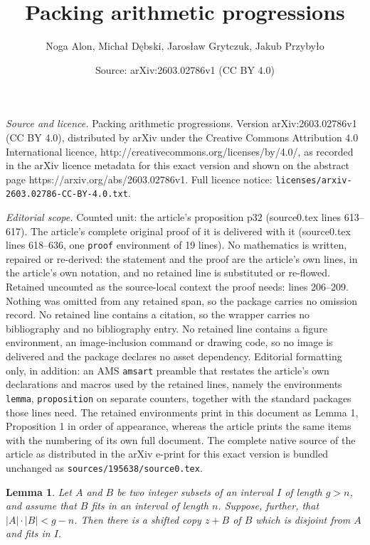 \documentclass[10pt,a4paper]{amsart}
\title{Packing arithmetic progressions}
\author{Noga Alon, Micha{\l} D\k ebski, Jaros\l aw Grytczuk, Jakub Przyby\l o}
\date{Source: arXiv:2603.02786v1 (CC BY 4.0)}
\newtheorem{lemma}{Lemma}
\begin{document}
\maketitle

\noindent\emph{Source and licence.} Packing arithmetic progressions. Version arXiv:2603.02786v1 (CC BY 4.0), distributed by arXiv under the Creative Commons Attribution 4.0 International licence, http://creativecommons.org/licenses/by/4.0/, as recorded in the arXiv licence metadata for this exact version and shown on the abstract page https://arxiv.org/abs/2603.02786v1. Full licence notice: \texttt{licenses/arxiv-2603.02786-CC-BY-4.0.txt}.\par\smallskip

\noindent\textit{Editorial scope.} Counted unit: the article's proposition p32 (source0.tex lines 613--617). The article's complete original proof of it is delivered with it (source0.tex lines 618--636, one \texttt{proof} environment of 19 lines). No mathematics is written, repaired or re-derived: the statement and the proof are the article's own lines, in the article's own notation, and no retained line is substituted or re-flowed.  Retained uncounted as the source-local context the proof needs: lines 206--209.  Nothing was omitted from any retained span, so the package carries no omission record.  No retained line contains a citation, so the wrapper carries no bibliography and no bibliography entry.  No retained line contains a figure environment, an image-inclusion command or drawing code, so no image is delivered and the package declares no asset dependency.  Editorial formatting only, in addition: an AMS \texttt{amsart} preamble that restates the article's own declarations and macros used by the retained lines, namely the environments \texttt{lemma}, \texttt{proposition} on separate counters, together with the standard packages those lines need.  The retained environments print in this document as Lemma 1, Proposition 1 in order of appearance, whereas the article prints the same items with the numbering of its own full document.  The complete native source of the article as distributed in the arXiv e-print for this exact version is bundled unchanged as \texttt{sources/195638/source0.tex}.
\begin{lemma}
	\label{l23}
	Let $A$ and $B$ be two integer subsets of an interval $I$ of length $g>n$, and assume that $B$ fits in an interval of length $n$. Suppose, further, that $|A| \cdot |B| < g-n$. Then there is a shifted 	copy $z+B$ of $B$ which is disjoint from $A$ and fits in $I$.
\end{lemma}
\end{document}
